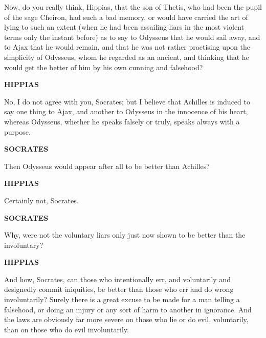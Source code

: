 \documentclass[11pt,letter]{article}
\begin{document}
\par  Now, do you really think, Hippias, that the son of Thetis, who had been the pupil of the sage Cheiron, had such a bad memory, or would have carried the art of lying to such an extent (when he had been assailing liars in the most violent terms only the instant before) as to say to Odysseus that he would sail away, and to Ajax that he would remain, and that he was not rather practising upon the simplicity of Odysseus, whom he regarded as an ancient, and thinking that he would get the better of him by his own cunning and falsehood?

\par \textbf{HIPPIAS}
\par   No, I do not agree with you, Socrates; but I believe that Achilles is induced to say one thing to Ajax, and another to Odysseus in the innocence of his heart, whereas Odysseus, whether he speaks falsely or truly, speaks always with a purpose.

\par \textbf{SOCRATES}
\par   Then Odysseus would appear after all to be better than Achilles?

\par \textbf{HIPPIAS}
\par   Certainly not, Socrates.

\par \textbf{SOCRATES}
\par   Why, were not the voluntary liars only just now shown to be better than the involuntary?

\par \textbf{HIPPIAS}
\par   And how, Socrates, can those who intentionally err, and voluntarily and designedly commit iniquities, be better than those who err and do wrong involuntarily? Surely there is a great excuse to be made for a man telling a falsehood, or doing an injury or any sort of harm to another in ignorance. And the laws are obviously far more severe on those who lie or do evil, voluntarily, than on those who do evil involuntarily.
\end{document}
